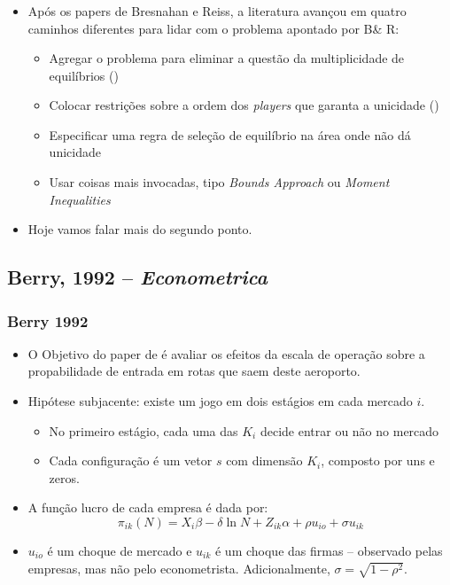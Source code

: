 \documentclass{beamer}
\begin{document}
\begin{frame}[fragile]\frametitle{\insertsection}
    \begin{itemize}
        \item Após os papers de Bresnahan e Reiss, a literatura avançou em quatro caminhos diferentes para lidar com o problema apontado por B\& R:
        \begin{itemize}
            \item Agregar o problema para eliminar a questão da multiplicidade de equilíbrios (\citet{Bresnahan1991a})
            \item Colocar restrições sobre a ordem dos \textit{players} que garanta a unicidade (\citet{Berry1992})
            \item Especificar uma regra de seleção de equilíbrio na área onde não dá unicidade
            \item Usar coisas mais invocadas, tipo \textit{Bounds Approach} ou \textit{Moment Inequalities}
        \end{itemize}
        \item Hoje vamos falar mais do segundo ponto.
    \end{itemize}


\end{frame}

\subsection{Berry, 1992 -- \textit{Econometrica}}
\begin{frame}[fragile]\frametitle{Berry 1992}
\begin{itemize}
    \item O Objetivo do paper de \citet{Berry1992} é avaliar os efeitos da escala de operação sobre a propabilidade de entrada em rotas que saem deste aeroporto.
    \item Hipótese subjacente: existe um jogo em dois estágios em cada mercado $i$. 
    \begin{itemize}
        \item No primeiro estágio, cada uma das $K_{i}$ decide entrar ou não no mercado
        \item Cada configuração é um vetor $s$ com dimensão $K_{i}$, composto por uns e zeros.
    \end{itemize}
    \item A função lucro de cada empresa é dada por:
    \[
    \pi_{ik}(N)=X_{i}\beta - \delta \ln{N} + Z_{ik} \alpha +\rho u_{io} + \sigma u_{ik}
    \]
    \item $u_{io}$ é um choque de mercado e $u_{ik}$ é um choque das firmas -- observado pelas empresas, mas não pelo econometrista. Adicionalmente, $\sigma=\sqrt{1-\rho^2}$.
\end{itemize}
\end{frame}
\end{document}

